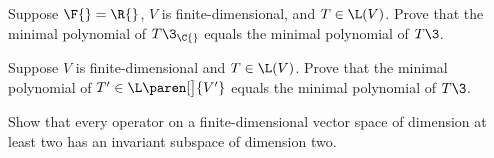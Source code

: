 \exercise
Suppose $\F{} = \R{}$, $V$ is finite-dimensional, and $T \in \L(V)$. Prove that the minimal polynomial of $T\3_{\C{}}$ equals the minimal polynomial of $T\3$.


\exercise
Suppose $V$ is finite-dimensional and $T \in \L(V)$. Prove that the minimal polynomial of $T' \in \L\paren[\big]{V'}$ equals the minimal polynomial of $T\3$.\label{5dualmin}


\exercise
Show that every operator on a finite-dimensional vector space of dimension at least two has an invariant subspace of dimension two.\label{5inv2}


